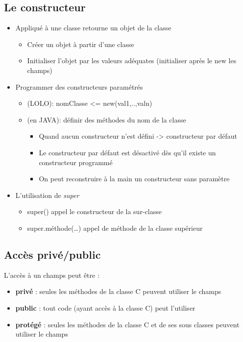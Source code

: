 \documentclass{article}
\begin{document}
\subsection{Le constructeur}
\begin{itemize}
	\item Appliqué à une classe retourne un objet de la classe
	\begin{itemize}
		\item Créer un objet à partir d'une classe
		\item Initialiser l'objet par les valeurs adéquates (initialiser 
		après le new les champs)
	\end{itemize}
	\item Programmer des constructeurs paramétrés
	\begin{itemize}
		\item (LOLO): nomClasse <= new(val1,..,valn)
		\item (en JAVA): définir des méthodes du nom de la classe
		\begin{itemize}
			\item Quand aucun constructeur n'est défini -> constructeur par défaut
			\item Le constructeur par défaut est désactivé dès qu'il existe un 
				constructeur programmé
			\item On peut reconstruire à la main un constructeur sans paramètre
		\end{itemize}
	\end{itemize}
	\item L'utilisation de \emph{super}
	\begin{itemize}
		\item super() appel le constructeur de la sur-classe
		\item super.méthode(\dots) appel de méthode de la classe supérieur
	\end{itemize}
\end{itemize}

\subsection{Accès privé/public}

L'accès à un champs peut être : 
\begin{itemize}
	\item \textbf{privé} : seules les méthodes de la classe C peuvent utiliser
		le champs
	\item \textbf{public} : tout code (ayant accès à la classe C) peut l’utiliser
	\item \textbf{protégé} : seules les méthodes de la classe C et de ses sous
		classes peuvent utiliser le champs
\end{itemize}
\end{document}

